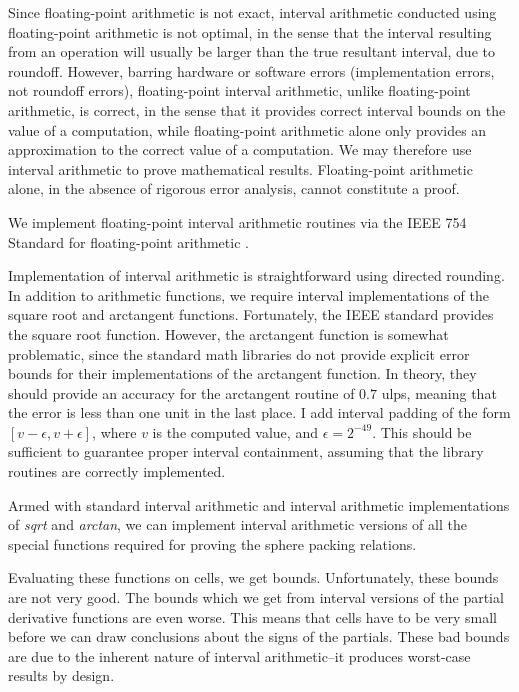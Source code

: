 Since floating-point arithmetic is not exact, interval arithmetic
conducted using floating-point arithmetic is not optimal, in the
sense that the interval resulting from an operation will usually
be larger than the true resultant interval, due to roundoff.
However, barring hardware or software errors (implementation errors,
not roundoff errors), floating-point
interval arithmetic, unlike floating-point arithmetic, is correct, in
the sense that it provides correct interval bounds on the value
of a computation, while floating-point arithmetic alone only
provides an approximation to the correct value of a computation.
We may therefore use interval arithmetic to prove mathematical
results.  Floating-point arithmetic alone, in the absence of
rigorous error analysis, cannot constitute a proof.

We implement floating-point interval arithmetic routines via
the IEEE 754 Standard for floating-point arithmetic \cite{IEEE}.

Implementation of interval arithmetic is straightforward using
directed rounding.  In addition to arithmetic functions, we require
interval implementations of the
square root and arctangent functions.  Fortunately, the IEEE standard
provides the square root function.  However, the arctangent function
is somewhat problematic, since the
standard math libraries do not provide explicit error bounds for their
implementations of the arctangent function.  In theory, they
should provide an accuracy for the arctangent routine of
$0.7$ ulps, meaning that the error is less than one unit in the
last place.  I add interval padding of the form
$[v-\epsilon, v+\epsilon]$,
where $v$ is the computed value, and $\epsilon = 2^{-49}$.
This should be sufficient to guarantee proper interval containment,
assuming that the library routines are correctly implemented.

Armed with standard interval arithmetic and interval arithmetic
implementations of {\em sqrt} and {\em arctan}, we can implement
interval arithmetic versions of all
the special functions required for proving the sphere packing
relations.

Evaluating these functions on cells, we get bounds.  Unfortunately,
these bounds are not very good.  The bounds which we get from
interval versions of the partial derivative functions are even
worse.  This means that cells have to be very small before we
can draw conclusions about the signs of the partials.  These bad
bounds are due to the inherent nature of interval arithmetic--it
produces worst-case results by design.

